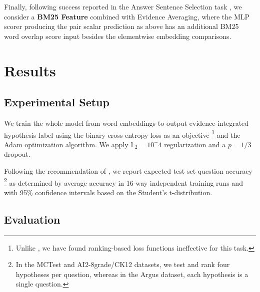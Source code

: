 \documentclass[11pt]{article}
\begin{document}
Finally, following success reported in the Answer Sentence Selection task \cite{sps},
we consider a \textbf{BM25 Feature} combined with Evidence Averaging,
where the MLP scorer producing the pair scalar prediction as above has
an additional BM25 word overlap score input \cite{BM25} besides the elementwise
embedding comparisons.

\section{Results}
\label{sec:res}

\subsection{Experimental Setup}

We train the whole model from word embeddings to output evidence-integrated
hypothesis label using the binary cross-entropy loss as an objective%
\footnote{Unlike \cite{HABCNN}, we have found ranking-based loss functions
	ineffective for this task.}
and the Adam optimization algorithm.  We apply $\mathbb{L}_2 = 10^-4$
regularization and a $p=1/3$ dropout.

Following the recommendation of \cite{sps}, we report expected test set
question accuracy%
\footnote{In the MCTest and AI2-8grade/CK12 datasets, we test and rank four
	hypotheses per question, whereas in the Argus dataset, each
	hypothesis is a single question.}
as determined by average accuracy in 16-way independent training runs
and with 95\% confidence intervals based on the Student's
t-distribution.

\subsection{Evaluation}
\end{document}
